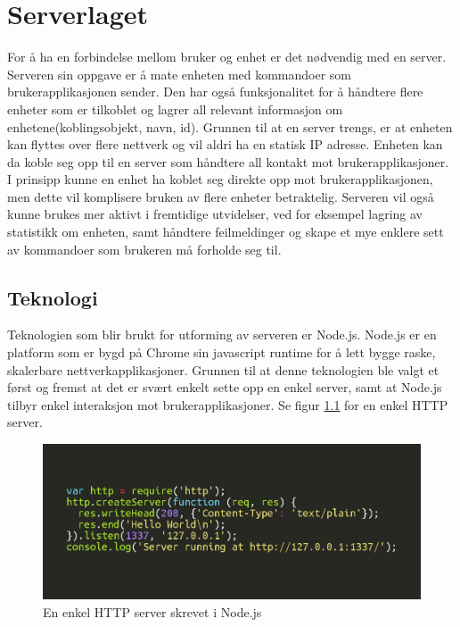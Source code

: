 \documentclass[12pt]{report}
\begin{document}
\clearpage

\chapter{Serverlaget}
For å ha en forbindelse mellom bruker og enhet er det nødvendig med en server. Serveren sin oppgave er å mate enheten med kommandoer som brukerapplikasjonen sender. Den har også funksjonalitet for å håndtere flere enheter som er tilkoblet og lagrer all relevant informasjon om enhetene(koblingsobjekt, navn, id). Grunnen til at en server trengs, er at enheten kan flyttes over flere nettverk og vil aldri ha en statisk IP adresse. Enheten kan da koble seg opp til en server som håndtere all kontakt mot brukerapplikasjoner. I prinsipp kunne en enhet ha koblet seg direkte opp mot brukerapplikasjonen, men dette vil komplisere bruken av flere enheter betraktelig. Serveren vil også kunne brukes mer aktivt i fremtidige utvidelser, ved for eksempel lagring av statistikk om enheten, samt håndtere feilmeldinger og skape et mye enklere sett av kommandoer som brukeren må forholde seg til.

\section{Teknologi}
Teknologien som blir brukt for utforming av serveren er Node.js\cite{Nodejs}. Node.js er en platform som er bygd på Chrome sin javascript runtime for å lett bygge raske, skalerbare nettverkapplikasjoner. Grunnen til at denne teknologien ble valgt et først og fremst at det er svært enkelt sette opp en enkel server, samt at Node.js tilbyr enkel interaksjon mot brukerapplikasjoner. Se figur \ref{htpserv} for en enkel HTTP server.

\begin{figure}[H]
	\includegraphics[scale=1.2]{imgs/node_basic_server}
	\centering
	\caption{En enkel HTTP server skrevet i Node.js}
	\label{htpserv}
\end{figure}
\end{document}
